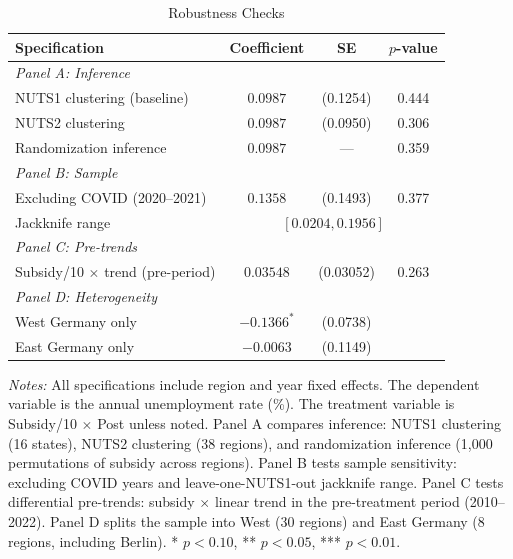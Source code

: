 \begin{table}[H]
\centering
\caption{Robustness Checks}
\label{tab:robust}
\begin{threeparttable}
\begin{tabular}{lccc}
\toprule
Specification & Coefficient & SE & $p$-value \\
\midrule
\multicolumn{4}{l}{\textit{Panel A: Inference}} \\
\quad NUTS1 clustering (baseline) & $0.0987$ & (0.1254) & 0.444 \\
\quad NUTS2 clustering & $0.0987$ & (0.0950) & 0.306 \\
\quad Randomization inference & $0.0987$ & --- & 0.359 \\
\midrule
\multicolumn{4}{l}{\textit{Panel B: Sample}} \\
\quad Excluding COVID (2020--2021) & $0.1358$ & (0.1493) & 0.377 \\
\quad Jackknife range & \multicolumn{3}{c}{$[0.0204, 0.1956]$} \\
\midrule
\multicolumn{4}{l}{\textit{Panel C: Pre-trends}} \\
\quad Subsidy/10 $\times$ trend (pre-period) & $0.03548$ & (0.03052) & 0.263 \\
\midrule
\multicolumn{4}{l}{\textit{Panel D: Heterogeneity}} \\
\quad West Germany only & $-0.1366^{*}$ & (0.0738) & \\
\quad East Germany only & $-0.0063$ & (0.1149) & \\
\bottomrule
\end{tabular}
\begin{tablenotes}[flushleft]
\small
\item \textit{Notes:} All specifications include region and year fixed effects. The dependent variable is the annual unemployment rate (\%). The treatment variable is Subsidy/10 $\times$ Post unless noted. Panel A compares inference: NUTS1 clustering (16 states), NUTS2 clustering (38 regions), and randomization inference (1,000 permutations of subsidy across regions). Panel B tests sample sensitivity: excluding COVID years and leave-one-NUTS1-out jackknife range. Panel C tests differential pre-trends: subsidy $\times$ linear trend in the pre-treatment period (2010--2022). Panel D splits the sample into West (30 regions) and East Germany (8 regions, including Berlin). * $p<0.10$, ** $p<0.05$, *** $p<0.01$.
\end{tablenotes}
\end{threeparttable}
\end{table}
